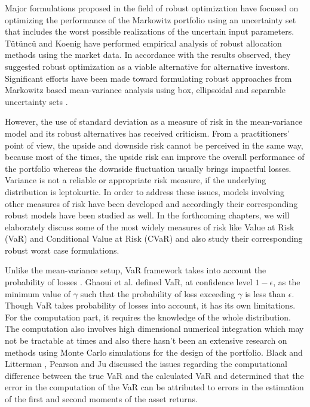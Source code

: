 \documentclass[12pt]{article}
\numberwithin{equation}{section}
\begin{document}
Major formulations proposed in the field of robust optimization have focused on optimizing the performance of the Markowitz portfolio using an uncertainty set that includes the worst possible realizations of the uncertain input parameters. T{\"u}t{\"u}nc{\"u} and Koenig \cite{tutuncu} have performed empirical analysis of robust allocation methods using the market data. In accordance with the results observed, they suggested robust optimization as a viable alternative for alternative investors. Significant efforts have been made toward formulating robust approaches from Markowitz based mean-variance analysis using box, ellipsoidal \cite{fabozzi,kim} and separable uncertainty sets \cite{lu}.

However, the use of standard deviation as a measure of risk in the mean-variance model and its robust alternatives has received criticism. From a practitioners' point of view, the upside and downside risk cannot be perceived in the same way, because most of the times, the upside risk can improve the overall performance of the portfolio whereas the downside fluctuation usually brings impactful losses. Variance is not a reliable or appropriate  risk measure, if the underlying distribution is leptokurtic. In order to address these issues, models involving other measures of risk have been developed and accordingly their corresponding robust models have been studied as well. In the forthcoming chapters, we will elaborately discuss some of the most widely measures of risk like Value at Risk (VaR) and Conditional Value at Risk (CVaR) and also study their corresponding robust worst case formulations.

Unlike the mean-variance setup, VaR framework takes into account the probability of losses \cite{var96}. Ghaoui et al. \cite{ghaoui03} defined VaR, at confidence level $1-\epsilon$, as the minimum value of $\gamma$ such that the probability of loss exceeding $\gamma$ is less than $\epsilon$. Though VaR takes probability of losses into account, it has its own limitations. For the computation part, it requires the knowledge of the whole distribution. The computation also involves high dimensional numerical integration which may not be tractable at times and also there hasn't been an extensive research on methods using Monte Carlo simulations \cite{var96} for the design of the portfolio. Black and Litterman \cite{Black}, Pearson and Ju \cite{ju98} discussed the issues regarding the computational difference between the true VaR and the calculated VaR and determined that the error in the computation of the VaR can be attributed to errors in the estimation of the first and second moments of the asset returns.
\end{document}
